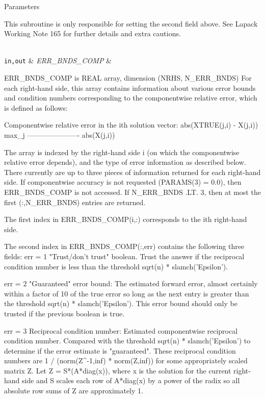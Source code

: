 \begin{DoxyParams}[1]{Parameters}
\begin{DoxyVerb}
     This subroutine is only responsible for setting the second field
     above.
     See Lapack Working Note 165 for further details and extra
     cautions.\end{DoxyVerb}
\\
\hline
\mbox{\tt in,out}  & {\em E\+R\+R\+\_\+\+B\+N\+D\+S\+\_\+\+C\+O\+M\+P} & \begin{DoxyVerb}          ERR_BNDS_COMP is REAL array, dimension (NRHS, N_ERR_BNDS)
     For each right-hand side, this array contains information about
     various error bounds and condition numbers corresponding to the
     componentwise relative error, which is defined as follows:

     Componentwise relative error in the ith solution vector:
                    abs(XTRUE(j,i) - X(j,i))
             max_j ----------------------
                         abs(X(j,i))

     The array is indexed by the right-hand side i (on which the
     componentwise relative error depends), and the type of error
     information as described below. There currently are up to three
     pieces of information returned for each right-hand side. If
     componentwise accuracy is not requested (PARAMS(3) = 0.0), then
     ERR_BNDS_COMP is not accessed.  If N_ERR_BNDS .LT. 3, then at most
     the first (:,N_ERR_BNDS) entries are returned.

     The first index in ERR_BNDS_COMP(i,:) corresponds to the ith
     right-hand side.

     The second index in ERR_BNDS_COMP(:,err) contains the following
     three fields:
     err = 1 "Trust/don't trust" boolean. Trust the answer if the
              reciprocal condition number is less than the threshold
              sqrt(n) * slamch('Epsilon').

     err = 2 "Guaranteed" error bound: The estimated forward error,
              almost certainly within a factor of 10 of the true error
              so long as the next entry is greater than the threshold
              sqrt(n) * slamch('Epsilon'). This error bound should only
              be trusted if the previous boolean is true.

     err = 3  Reciprocal condition number: Estimated componentwise
              reciprocal condition number.  Compared with the threshold
              sqrt(n) * slamch('Epsilon') to determine if the error
              estimate is "guaranteed". These reciprocal condition
              numbers are 1 / (norm(Z^{-1},inf) * norm(Z,inf)) for some
              appropriately scaled matrix Z.
              Let Z = S*(A*diag(x)), where x is the solution for the
              current right-hand side and S scales each row of
              A*diag(x) by a power of the radix so all absolute row
              sums of Z are approximately 1.


\end{DoxyVerb}
\end{DoxyParams}
